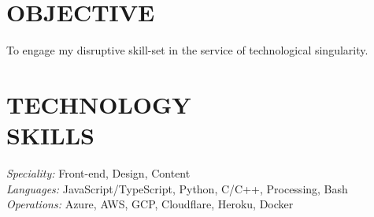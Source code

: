 \documentclass[margin, 10pt]{res} %
\begin{document}
\begin{resume}

\section{OBJECTIVE}  
To engage my disruptive skill-set in the service of technological singularity.


\section{TECHNOLOGY \\ SKILLS} 

{\sl Speciality:} Front-end, Design, Content \\
{\sl Languages:} JavaScript/TypeScript, Python, C/C++, Processing, Bash\\
{\sl Operations:} Azure, AWS, GCP, Cloudflare, Heroku, Docker



\end{resume}
\end{document}
